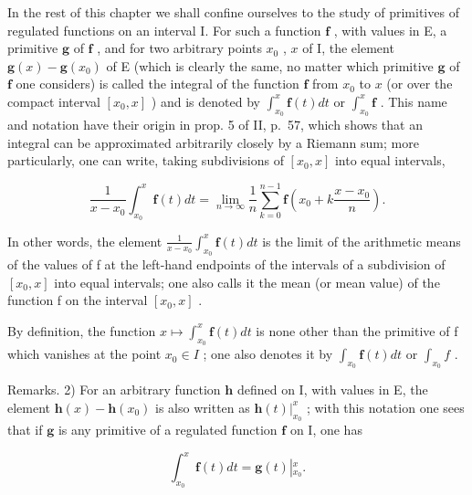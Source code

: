 In the rest of this chapter we shall confine ourselves to the study of primitives of regulated functions on an interval I. For such a function \(\mathbf{f}\) , with values in E, a primitive \(\mathbf{g}\) of \(\mathbf{f}\) , and for two arbitrary points \(x_0\) , \(x\) of I, the element \(\mathbf{g}(x) - \mathbf{g}(x_0)\) of E (which is clearly the same, no matter which primitive \(\mathbf{g}\) of \(\mathbf{f}\) one considers) is called the integral of the function \(\mathbf{f}\) from \(x_0\) to \(x\) (or over the compact interval \([x_0, x]\) ) and is denoted by \(\int_{x_0}^{x} \mathbf{f}(t) dt\) or \(\int_{x_0}^{x} \mathbf{f}\) . This name and notation have their origin in prop. 5 of II, p.~57, which shows that an integral can be approximated arbitrarily closely by a Riemann sum; more particularly, one can write, taking subdivisions of \([x_0, x]\) into equal intervals,

\[
\frac {1}{x - x _ {0}} \int_ {x _ {0}} ^ {x} \mathbf {f} (t) d t = \lim _ {n \rightarrow \infty} \frac {1}{n} \sum_ {k = 0} ^ {n - 1} \mathbf {f} \left(x _ {0} + k \frac {x - x _ {0}}{n}\right).\tag{2}
\]

In other words, the element \(\frac{1}{x-x_{0}}\int_{x_{0}}^{x}\mathbf{f}(t)dt\) is the limit of the arithmetic means of the values of f at the left-hand endpoints of the intervals of a subdivision of \([x_{0},x]\) into equal intervals; one also calls it the mean (or mean value) of the function f on the interval \([x_{0},x]\) .

By definition, the function \(x \mapsto \int_{x_{0}}^{x} \mathbf{f}(t) dt\) is none other than the primitive of f which vanishes at the point \(x_{0} \in I\) ; one also denotes it by \(\int_{x_{0}} \mathbf{f}(t) dt\) or \(\int_{x_{0}} f\) .

Remarks. 2) For an arbitrary function \(\mathbf{h}\) defined on I, with values in E, the element \(\mathbf{h}(x) - \mathbf{h}(x_0)\) is also written as \(\left.\mathbf{h}(t)\right|_{x_0}^x\) ; with this notation one sees that if \(\mathbf{g}\) is any primitive of a regulated function \(\mathbf{f}\) on I, one has

\[
\int_ {x _ {0}} ^ {x} \mathbf {f} (t) d t = \mathbf {g} (t) \left| _ {x _ {0}} ^ {x}. \right.\tag{3}
\]

